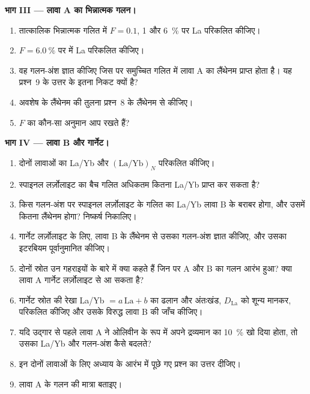 \begin{problem}
\medskip\noindent\textbf{भाग III --- लावा A का भिन्नात्मक गलन।}
\begin{enumerate}[resume]
\item तात्कालिक भिन्नात्मक गलित में $F = 0.1$, 1 और
\qty{6}{\percent} पर La परिकलित कीजिए।
\item $F = \qty{6.0}{\percent}$ पर  में La परिकलित कीजिए।
\item वह गलन-अंश ज्ञात कीजिए जिस पर समुच्चित गलित में लावा A का
लैंथेनम प्राप्त होता है। यह प्रश्न~9 के उत्तर के इतना निकट क्यों है?
\item अवशेष के लैंथेनम की तुलना प्रश्न~8 के लैंथेनम से कीजिए।
\item $F$ का कौन-सा अनुमान आप रखते हैं?
\end{enumerate}

\medskip\noindent\textbf{भाग IV --- लावा B और गार्नेट।}
\begin{enumerate}[resume]
\item दोनों लावाओं का La/Yb और $(\mathrm{La}/\mathrm{Yb})_N$ परिकलित कीजिए।
\item स्पाइनल लर्ज़ोलाइट का बैच गलित अधिकतम कितना La/Yb
प्राप्त कर सकता है?
\item किस गलन-अंश पर स्पाइनल लर्ज़ोलाइट के गलित का La/Yb
लावा B के बराबर होगा, और उसमें कितना लैंथेनम होगा? निष्कर्ष निकालिए।
\item गार्नेट लर्ज़ोलाइट के लिए, लावा B के लैंथेनम से उसका गलन-अंश
ज्ञात कीजिए, और उसका इटरबियम पूर्वानुमानित कीजिए।
\item दोनों स्रोत उन गहराइयों के बारे में क्या कहते हैं जिन पर A और B
का गलन आरंभ हुआ? क्या लावा A गार्नेट लर्ज़ोलाइट से आ सकता है?
\item गार्नेट स्रोत की  रेखा La/Yb $= a\,
\mathrm{La} + b$ का ढलान और अंतःखंड, $D_{\mathrm{La}}$ को शून्य मानकर, परिकलित कीजिए
और उसके विरुद्ध लावा B की जाँच कीजिए।
\item यदि उद्गार से पहले लावा A ने ओलिवीन के रूप में अपने द्रव्यमान का
\qty{10}{\percent} खो दिया होता, तो उसका La/Yb और गलन-अंश कैसे बदलते?
\item इन दोनों लावाओं के लिए अध्याय के आरंभ में पूछे गए प्रश्न का उत्तर दीजिए।
\item लावा A के गलन की मात्रा बताइए।
\end{enumerate}
\end{problem}
